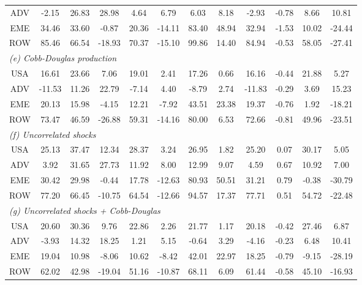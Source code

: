 \begin{table}[p]
\begin{center}
\begin{tabular}{cccccccccccc}
ADV&-2.15&26.83&28.98&4.64&6.79&6.03&8.18&-2.93&-0.78&8.66&10.81\\
EME&34.46&33.60&-0.87&20.36&-14.11&83.40&48.94&32.94&-1.53&10.02&-24.44\\
ROW&85.46&66.54&-18.93&70.37&-15.10&99.86&14.40&84.94&-0.53&58.05&-27.41\\
\midrule
\multicolumn{12}{l}{\textit{(e) Cobb-Douglas production}}\\
USA&16.61&23.66&7.06&19.01&2.41&17.26&0.66&16.16&-0.44&21.88&5.27\\
ADV&-11.53&11.26&22.79&-7.14&4.40&-8.79&2.74&-11.83&-0.29&3.69&15.23\\
EME&20.13&15.98&-4.15&12.21&-7.92&43.51&23.38&19.37&-0.76&1.92&-18.21\\
ROW&73.47&46.59&-26.88&59.31&-14.16&80.00&6.53&72.66&-0.81&49.96&-23.51\\
\midrule
\multicolumn{12}{l}{\textit{(f) Uncorrelated shocks}}\\
USA&25.13&37.47&12.34&28.37&3.24&26.95&1.82&25.20&0.07&30.17&5.05\\
ADV&3.92&31.65&27.73&11.92&8.00&12.99&9.07&4.59&0.67&10.92&7.00\\
EME&30.42&29.98&-0.44&17.78&-12.63&80.93&50.51&31.21&0.79&-0.38&-30.79\\
ROW&77.20&66.45&-10.75&64.54&-12.66&94.57&17.37&77.71&0.51&54.72&-22.48\\
\midrule
\multicolumn{12}{l}{\textit{(g) Uncorrelated shocks + Cobb-Douglas}}\\
USA&20.60&30.36&9.76&22.86&2.26&21.77&1.17&20.18&-0.42&27.46&6.87\\
ADV&-3.93&14.32&18.25&1.21&5.15&-0.64&3.29&-4.16&-0.23&6.48&10.41\\
EME&19.04&10.98&-8.06&10.62&-8.42&42.01&22.97&18.25&-0.79&-9.15&-28.19\\
ROW&62.02&42.98&-19.04&51.16&-10.87&68.11&6.09&61.44&-0.58&45.10&-16.93\\
\bottomrule
\end{tabular}
\normalsize
\end{center}
\end{table}
